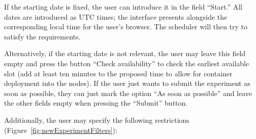 \documentclass[a4paper,10pt]{article}
\begin{document}
If the starting date is fixed, the user can introduce it in the field ``Start.''
All dates are introduced as UTC times; the interface presents alongside the corresponding local time for the user's browser.
The scheduler will then try to satisfy the requirements.

Alternatively, if the starting date is not relevant, the user may leave this field empty and press the button ``Check availability'' to check the earliest available slot (add at least ten minutes to the proposed time to allow for container deployment into the nodes).
If the user just wants to submit the experiment as soon as possible, they can just mark the option ``As soon as possible'' and leave the other fields empty when pressing the ``Submit'' button.

Additionally, the user may specify the following restrictions (Figure~\ref{fig:newExperimentFilters}):
\end{document}
